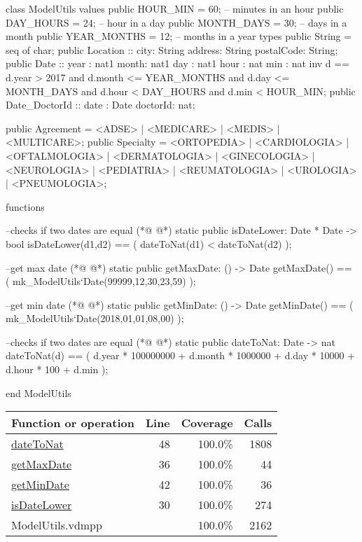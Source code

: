 \begin{vdmpp}[breaklines=true]
class ModelUtils
values
 public HOUR_MIN = 60; -- minutes in an hour
 public DAY_HOURS = 24; -- hour in a day
 public MONTH_DAYS = 30; -- days in a month
 public YEAR_MONTHS = 12; -- months in a year
types
 public String = seq of char;
 public Location :: city: String
           address: String
           postalCode: String;
 public Date :: year : nat1
         month: nat1
         day : nat1
         hour : nat
         min : nat
 inv d == d.year > 2017 and d.month <= YEAR_MONTHS and d.day <= MONTH_DAYS and d.hour < DAY_HOURS and d.min < HOUR_MIN;
 public Date_DoctorId :: date : Date
              doctorId: nat;
        
 public Agreement = <ADSE> | <MEDICARE> | <MEDIS> | <MULTICARE>;
 public Specialty = <ORTOPEDIA> | <CARDIOLOGIA> | <OFTALMOLOGIA> | 
           <DERMATOLOGIA> | <GINECOLOGIA> | <NEUROLOGIA> | 
           <PEDIATRIA> | <REUMATOLOGIA> | <UROLOGIA> |
           <PNEUMOLOGIA>;

functions
 
 --checks if two dates are equal
(*@
\label{isDateLower:30}
@*)
 static public isDateLower: Date * Date -> bool
 isDateLower(d1,d2) == (
  dateToNat(d1) < dateToNat(d2)
 );
 
 --get max date
(*@
\label{getMaxDate:36}
@*)
 static public getMaxDate: () -> Date
 getMaxDate() == (
  mk_ModelUtils`Date(99999,12,30,23,59)
 );
 
 --get min date
(*@
\label{getMinDate:42}
@*)
 static public getMinDate: () -> Date
 getMinDate() == (
  mk_ModelUtils`Date(2018,01,01,08,00)
 );
 
 --checks if two dates are equal
(*@
\label{dateToNat:48}
@*)
 static public dateToNat: Date -> nat
 dateToNat(d) == (
  d.year * 100000000 + 
  d.month * 1000000 + 
  d.day * 10000 + 
  d.hour * 100 + 
  d.min 
 );

end ModelUtils
\end{vdmpp}
\bigskip
\begin{longtable}{|l|r|r|r|}
\hline
Function or operation & Line & Coverage & Calls \\
\hline
\hline
\hyperref[dateToNat:48]{dateToNat} & 48&100.0\% & 1808 \\
\hline
\hyperref[getMaxDate:36]{getMaxDate} & 36&100.0\% & 44 \\
\hline
\hyperref[getMinDate:42]{getMinDate} & 42&100.0\% & 36 \\
\hline
\hyperref[isDateLower:30]{isDateLower} & 30&100.0\% & 274 \\
\hline
\hline
ModelUtils.vdmpp & & 100.0\% & 2162 \\
\hline
\end{longtable}

